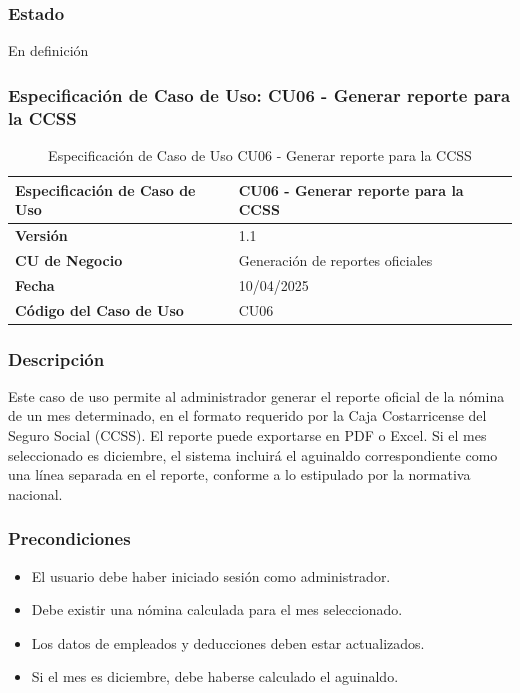 \subsubsection*{Estado}
En definición

\subsubsection*{Especificación de Caso de Uso: CU06 - Generar reporte para la CCSS}

\begin{table}[h]
	\centering
	\caption{Especificación de Caso de Uso CU06 - Generar reporte para la CCSS}
	\begin{tabular}{|p{5cm}|p{9cm}|}
		\hline
		\textbf{Especificación de Caso de Uso} & CU06 - Generar reporte para la CCSS \\ \hline
		\textbf{Versión}                       & 1.1                                 \\ \hline
		\textbf{CU de Negocio}                 & Generación de reportes oficiales    \\ \hline
		\textbf{Fecha}                         & 10/04/2025                          \\ \hline
		\textbf{Código del Caso de Uso}        & CU06                                \\ \hline
	\end{tabular}
\end{table}

\subsubsection*{Descripción}
Este caso de uso permite al administrador generar el reporte oficial de la nómina de un mes determinado, en el formato requerido por la Caja Costarricense del Seguro Social (CCSS). El reporte puede exportarse en PDF o Excel. Si el mes seleccionado es diciembre, el sistema incluirá el aguinaldo correspondiente como una línea separada en el reporte, conforme a lo estipulado por la normativa nacional.

\subsubsection*{Precondiciones}
\begin{itemize}
	\item El usuario debe haber iniciado sesión como administrador.
	\item Debe existir una nómina calculada para el mes seleccionado.
	\item Los datos de empleados y deducciones deben estar actualizados.
	\item Si el mes es diciembre, debe haberse calculado el aguinaldo.
\end{itemize}

